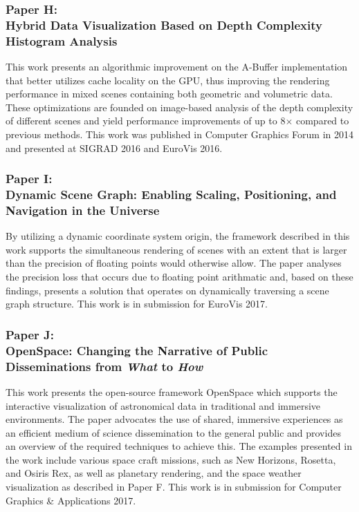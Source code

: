 \subsubsection{Paper H:\\Hybrid Data Visualization Based on Depth Complexity Histogram Analysis}
This work presents an algorithmic improvement on the A-Buffer implementation that better utilizes cache locality on the GPU, thus improving the rendering performance in mixed scenes containing both geometric and volumetric data. These optimizations are founded on image-based analysis of the depth complexity of different scenes and yield performance improvements of up to 8$\times$ compared to previous methods. This work was published in Computer Graphics Forum in 2014 and presented at SIGRAD 2016 and EuroVis 2016.

\subsubsection{Paper I:\\Dynamic Scene Graph: Enabling Scaling, Positioning, and Navigation in the Universe}
By utilizing a dynamic coordinate system origin, the framework described in this work supports the simultaneous rendering of scenes with an extent that is larger than the precision of floating points would otherwise allow. The paper analyses the precision loss that occurs due to floating point arithmatic and, based on these findings, presents a solution that operates on dynamically traversing a scene graph structure. This work is in submission for EuroVis 2017.

\subsubsection{Paper J:\\OpenSpace: Changing the Narrative of Public Disseminations from \emph{What} to \emph{How}}
This work presents the open-source framework OpenSpace which supports the interactive visualization of astronomical data in traditional and immersive environments. The paper advocates the use of shared, immersive experiences as an efficient medium of science dissemination to the general public and provides an overview of the required techniques to achieve this. The examples presented in the work include various space craft missions, such as New Horizons, Rosetta, and Osiris Rex, as well as planetary rendering, and the space weather visualization as described in Paper F. This work is in submission for Computer Graphics \& Applications 2017.
